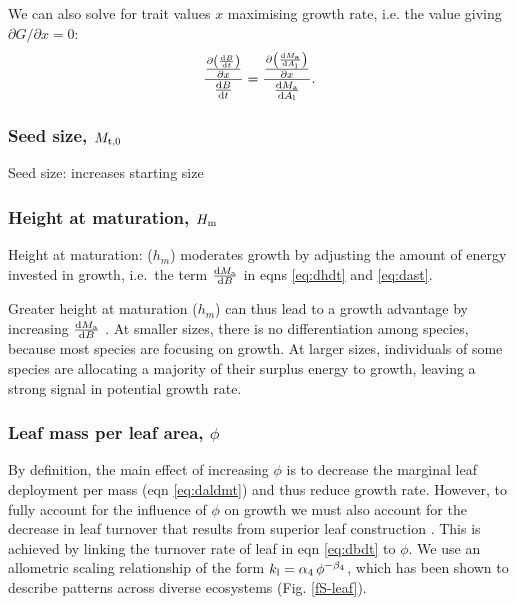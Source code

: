 \documentclass[a4paper,11pt]{article}
\begin{document}
We can also solve for trait values $x$ maximising growth rate, i.e. the value giving $\partial G /\partial x = 0$:
\begin{equation}\label{eq:max}
\frac{\frac{\partial \left( \frac{ {\rm d}B} {{\rm d}t}\right)}{\partial x} } {\frac{ {\rm d}B} {{\rm d}t}} = \frac{ \frac{\partial \left(\frac{{\rm d}M_{\rm a}} {{\rm d}A_{\rm l}}\right)}{\partial x}}{\frac{{\rm d}M_{\rm a}} {{\rm d}A_{\rm l}}}.
\end{equation}

\subsubsection{Seed size, $M_{\rm t,0}$}

Seed size: increases starting size

\subsubsection{Height at maturation, $H_{\rm m}$}

Height at maturation: ($h_m$) moderates growth by adjusting the amount of energy invested in growth, i.e.~the term $\frac{{\rm d}M_{\rm a}}{{\rm d}B}$ in eqns \ref{eq:dhdt} and \ref{eq:dast}.

Greater height at maturation ($h_m$) can thus lead to a growth advantage by increasing $\frac{{\rm d}M_{\rm a}}{{\rm d}B}$ . At smaller sizes, there is no differentiation among species, because most species are focusing on growth. At larger sizes, individuals of some species are allocating a majority of their surplus energy to growth, leaving a strong signal in potential growth rate.

\citet{Wenk-2015}

\subsubsection{Leaf mass per leaf area, $\phi$}

By definition, the main effect of increasing $\phi$ is to decrease the marginal leaf deployment per mass (eqn \ref{eq:daldmt}) and thus reduce growth rate. However, to fully account for the influence of $\phi$ on growth we must also account for the decrease in leaf turnover that results from superior leaf construction \citep{Wright-2004}. This is achieved by linking the turnover rate of leaf in eqn \ref{eq:dbdt} to $\phi$. We use an allometric scaling relationship of the form $k_{\rm l}=\alpha_4 \, \phi^{-\beta_4}$, which has been shown to describe patterns across diverse ecosystems \citep{Wright-2004} (Fig. \ref{fS-leaf}).
\end{document}
